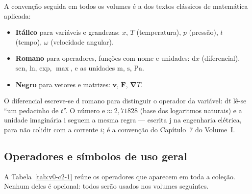 \documentclass[12pt,a4paper]{article}
\numberwithin{equation}{section}
\numberwithin{table}{section}
\numberwithin{figure}{section}
\begin{document}
A convenção seguida em todos os volumes é a dos textos clássicos de
matemática aplicada:

\begin{itemize}
\item \textbf{Itálico} para variáveis e grandezas: $x$, $T$ (temperatura),
$p$ (pressão), $t$ (tempo), $\omega$ (velocidade angular).
\item \textbf{Romano} para operadores, funções com nome e unidades:
$\mathrm{d}x$ (diferencial), $\mathrm{sen}$, $\mathrm{ln}$, $\mathrm{exp}$,
$\max$, e as unidades $\mathrm{m}$, $\mathrm{s}$, $\mathrm{Pa}$.
\item \textbf{Negro} para vetores e matrizes: $\bm{v}$, $\bm{F}$,
$\bm{\nabla}T$.
\end{itemize}

O diferencial escreve-se $\mathrm{d}$ romano para distinguir o operador da
variável: $\mathrm{d}t$ lê-se ``um pedacinho de $t$''. O número
$\mathrm{e} \approx 2{,}71828$ (base dos logaritmos naturais) e a unidade
imaginária $\mathrm{i}$ seguem a mesma regra --- escrita $\mathrm{j}$ na
engenharia elétrica, para não colidir com a corrente $i$; é a convenção do
Capítulo~7 do Volume~I.

\subsection{Operadores e símbolos de uso geral}

A Tabela~\ref{tab:v0-c2-1} reúne os operadores que aparecem em toda a
coleção. Nenhum deles é opcional: todos serão usados nos volumes seguintes.
\end{document}
